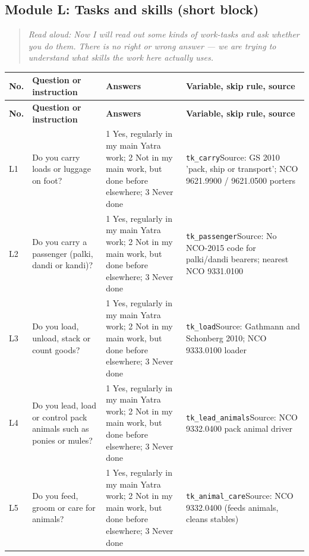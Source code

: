 \documentclass[10pt]{article}
\begin{document}
\subsection*{Module L: Tasks and skills (short block)}
\begin{quote}\small\textit{Read aloud: Now I will read out some kinds of work-tasks and ask whether you do them. There is no right or wrong answer — we are trying to understand what skills the work here actually uses.}\end{quote}
{\scriptsize
\begin{longtable}{p{0.8cm}p{6.4cm}p{3.6cm}p{5.8cm}}
\toprule
\textbf{No.} & \textbf{Question or instruction} & \textbf{Answers} & \textbf{Variable, skip rule, source} \\
\midrule
\endfirsthead
\toprule
\textbf{No.} & \textbf{Question or instruction} & \textbf{Answers} & \textbf{Variable, skip rule, source} \\
\midrule
\endhead
L1 & Do you carry loads or luggage on foot?  & 1 Yes, regularly in my main Yatra work; 2 Not in my main work, but done before elsewhere; 3 Never done & \texttt{tk\_carry}\newline Source: GS 2010 'pack, ship or transport'; NCO 9621.9900 / 9621.0500 porters \\
L2 & Do you carry a passenger (palki, dandi or kandi)?  & 1 Yes, regularly in my main Yatra work; 2 Not in my main work, but done before elsewhere; 3 Never done & \texttt{tk\_passenger}\newline Source: No NCO-2015 code for palki/dandi bearers; nearest NCO 9331.0100 \\
L3 & Do you load, unload, stack or count goods?  & 1 Yes, regularly in my main Yatra work; 2 Not in my main work, but done before elsewhere; 3 Never done & \texttt{tk\_load}\newline Source: Gathmann and Schonberg 2010; NCO 9333.0100 loader \\
L4 & Do you lead, load or control pack animals such as ponies or mules?  & 1 Yes, regularly in my main Yatra work; 2 Not in my main work, but done before elsewhere; 3 Never done & \texttt{tk\_lead\_animals}\newline Source: NCO 9332.0400 pack animal driver \\
L5 & Do you feed, groom or care for animals?  & 1 Yes, regularly in my main Yatra work; 2 Not in my main work, but done before elsewhere; 3 Never done & \texttt{tk\_animal\_care}\newline Source: NCO 9332.0400 (feeds animals, cleans stables) \\

\end{longtable}}
\end{document}
